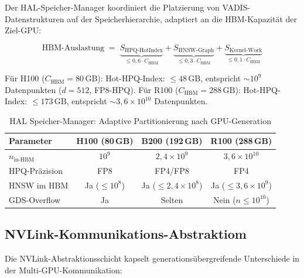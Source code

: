 ﻿\documentclass[12pt,a4paper]{article}
\begin{document}
Der HAL-Speicher-Manager koordiniert die Platzierung von
VADIS-Datenstrukturen auf der Speicherhierarchie,
adaptiert an die HBM-Kapazität der Ziel-GPU:

\begin{equation}
  \text{HBM-Auslastung} \;=\;
  \underbrace{S_{\text{HPQ-HotIndex}}}_{\leq 0{,}6 \cdot C_{\text{HBM}}}
  + \underbrace{S_{\text{HNSW-Graph}}}_{\leq 0{,}3 \cdot C_{\text{HBM}}}
  + \underbrace{S_{\text{Kernel-Work}}}_{\leq 0{,}1 \cdot C_{\text{HBM}}}
\end{equation}

Für H100 ($C_{\text{HBM}} = 80\,\text{GB}$):
Hot-HPQ-Index: $\leq 48\,\text{GB}$, entspricht
$\sim 10^9$ Datenpunkten ($d=512$, FP8-HPQ).
Für R100 ($C_{\text{HBM}} = 288\,\text{GB}$):
Hot-HPQ-Index: $\leq 173\,\text{GB}$, entspricht
$\sim 3{,}6 \times 10^{10}$ Datenpunkten.

\begin{table}[ht]
\centering
\small
\caption{HAL Speicher-Manager: Adaptive Partitionierung nach GPU-Generation}
\label{tab:memory_manager}
\begin{tabular}{@{}lccc@{}}
\toprule
\textbf{Parameter} & \textbf{H100 (80\,GB)} & \textbf{B200 (192\,GB)} & \textbf{R100 (288\,GB)} \\
\midrule
$n_{\text{in-HBM}}$ & $10^9$ & $2{,}4 \times 10^9$ & $3{,}6 \times 10^{10}$ \\
HPQ-Präzision & FP8 & FP4/FP8 & FP4 \\
HNSW im HBM & Ja ($\leq 10^8$) & Ja ($\leq 2{,}4\times10^8$) & Ja ($\leq 3{,}6\times10^9$) \\
GDS-Overflow & Ja & Selten & Nein ($n \leq 10^{10}$) \\
\bottomrule
\end{tabular}
\end{table}

\subsection{NVLink-Kommunikations-Abstraktiom}
\label{sub:nvlink_abstraction}

Die NVLink-Abstraktionsschicht kapselt generationsübergreifende
Unterschiede in der Multi-GPU-Kommunikation:
\end{document}
